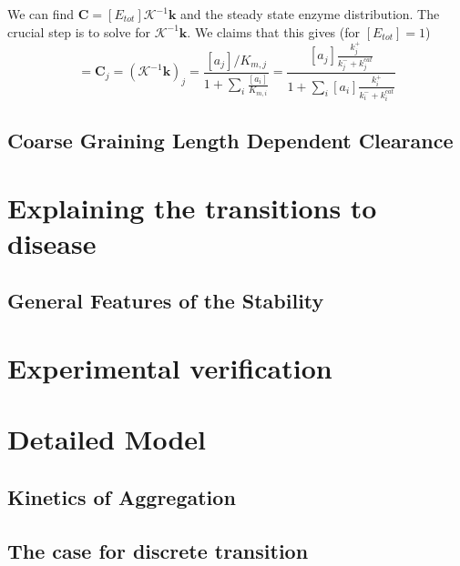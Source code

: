 We can find $\mathbf{C}=[E_{tot}]\mathcal{K}^{-1}\mathbf{k}$ and the steady state enzyme distribution. The crucial step is to solve for $\mathcal{K}^{-1}\mathbf{k}$. We claims that this gives (for $[E_{tot}]=1$)
\begin{equation}
    [EC_j] = \mathbf{C}_j = (\mathcal{K}^{-1}\mathbf{k})_j = \frac{[a_j]/K_{m,j}}{1+\sum_i\frac{[a_i]}{K_{m,i}}} = \frac{[a_j]\frac{k_j^+}{k_j^- + k^{cat}_j}}{1+\sum_i[a_i]\frac{k_i^+}{k_i^- + k^{cat}_i}}
\end{equation}

\subsection{Coarse Graining Length Dependent Clearance}

\section{Explaining the transitions to disease}

\subsection{General Features of the Stability}

\section{Experimental verification}


\section{Detailed Model}

\subsection{Kinetics of Aggregation}

\subsection{The case for discrete transition}


